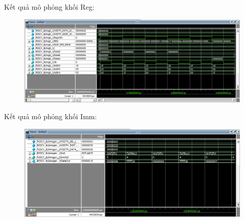 \documentclass[E:/Latex/ExtraWork/ComputerArchitechture/Report.tex]{subfiles}
\begin{document}
\begin{otherlanguage}{english}
				\newpage
				Kết quả mô phỏng khối Reg:
					\begin{figure}[h!]
						\includegraphics[scale = 0.6]{Figure/Fig8.png}
						\centering
					\end{figure}

				Kết quả mô phỏng khối Imm:
					\begin{figure}[h!]
						\includegraphics[scale = 0.7]{Figure/Fig9.png}
						\centering
					\end{figure}

	\end{otherlanguage}
\end{document}
